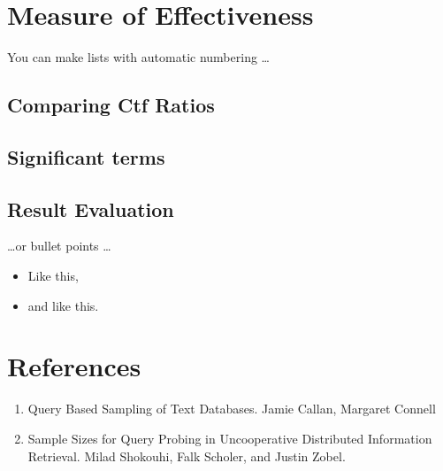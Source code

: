 \documentclass[paper=a4, fontsize=11pt,twoside]{scrartcl}	%
\begin{document}
\section{Measure of Effectiveness}

You can make lists with automatic numbering \dots

\subsection{Comparing Ctf Ratios}


\subsection{Significant terms}

\subsection{Result Evaluation}

\dots or bullet points \dots
\begin{itemize}
\item Like this,
\item and like this.
\end{itemize}


\section{References}

\begin{enumerate}
  \item Query Based Sampling of Text Databases. Jamie Callan, Margaret Connell 
  \item Sample Sizes for Query Probing in Uncooperative Distributed Information Retrieval. Milad Shokouhi, 
  Falk Scholer, and Justin Zobel. 
\end{enumerate}

\end{document}
